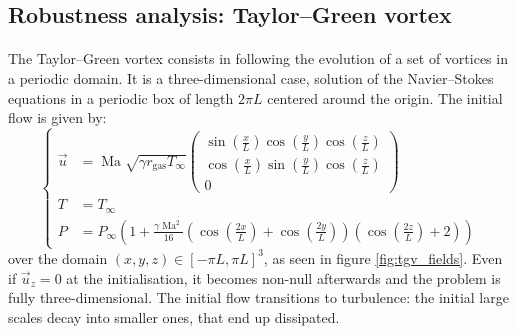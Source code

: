     \subsection{Robustness analysis: Taylor--Green vortex}

      \paragraph{}
      The Taylor--Green vortex consists in following the evolution of a set of vortices in a periodic domain.
      It is a three-dimensional case, solution of the Navier--Stokes equations in a periodic box of length $2 \pi L$ centered around the origin.
      The initial flow is given by:
      \begin{equation}\label{eq:tgv}
        \left\{\begin{aligned}
          \vec{u} &= \operatorname{Ma} \sqrt{\gamma r_\textrm{gas} T_\infty} \begin{pmatrix}
            \sin\left(\frac{x}{L}\right) \cos\left(\frac{y}{L}\right) \cos\left(\frac{z}{L}\right) \\[10pt]
            \cos\left(\frac{x}{L}\right) \sin\left(\frac{y}{L}\right) \cos\left(\frac{z}{L}\right) \\[10pt]
            0
          \end{pmatrix} \\[10pt]
          T &= T_\infty \\[10pt]
          P &= P_\infty \left(1 + \frac{\gamma \operatorname{Ma}^2}{16} \left(\cos\left(\frac{2x}{L}\right) + \cos\left(\frac{2y}{L}\right)\right) \left(\cos\left(\frac{2z}{L}\right) + 2\right) \right)
        \end{aligned}\right.
      \end{equation}
      over the domain $\left(x, y, z\right) \in \left[-\pi L, \pi L\right]^3$, as seen in figure \ref{fig:tgv_fields}.
      Even if $\vec{u}_z = 0$ at the initialisation, it becomes non-null afterwards and the problem is fully three-dimensional.
      The initial flow transitions to turbulence: the initial large scales decay into smaller ones, that end up dissipated.

